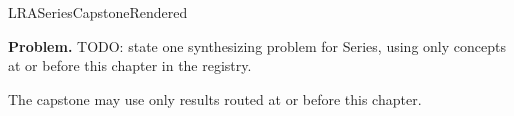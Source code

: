 \ifcsname LRASeriesCapstoneRendered\endcsname
\else
\expandafter\gdef\csname LRASeriesCapstoneRendered\endcsname{}

\newpage
{}
\label{cap:series}

\begin{tcolorbox}[
  colback=gray!6,
  colframe=gray!40,
  arc=2pt,
  left=8pt, right=8pt, top=6pt, bottom=6pt,
  title={\small\textbf{Capstone Problem}},
  fonttitle=\small\bfseries
]
\textbf{Problem.}
TODO: state one synthesizing problem for Series, using only concepts at or
before this chapter in the registry.
\end{tcolorbox}

\begin{remark*}
The capstone may use only results routed at or before this chapter.
\end{remark*}

\clearpage
\fi
